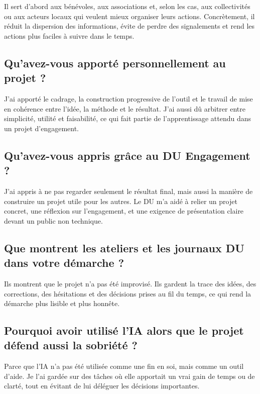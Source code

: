 \documentclass[
  10pt,
  a4paper,
  DIV=11,
  numbers=noendperiod,
  oneside]{scrreprt}
\begin{document}
Il sert d'abord aux bénévoles, aux associations et, selon les cas, aux
collectivités ou aux acteurs locaux qui veulent mieux organiser leurs
actions. Concrètement, il réduit la dispersion des informations, évite
de perdre des signalements et rend les actions plus faciles à suivre
dans le temps.

\subsection{Qu'avez-vous apporté personnellement au projet
?}\label{quavez-vous-apportuxe9-personnellement-au-projet}

J'ai apporté le cadrage, la construction progressive de l'outil et le
travail de mise en cohérence entre l'idée, la méthode et le résultat.
J'ai aussi dû arbitrer entre simplicité, utilité et faisabilité, ce qui
fait partie de l'apprentissage attendu dans un projet d'engagement.

\subsection{Qu'avez-vous appris grâce au DU Engagement
?}\label{quavez-vous-appris-gruxe2ce-au-du-engagement}

J'ai appris à ne pas regarder seulement le résultat final, mais aussi la
manière de construire un projet utile pour les autres. Le DU m'a aidé à
relier un projet concret, une réflexion sur l'engagement, et une
exigence de présentation claire devant un public non technique.

\subsection{Que montrent les ateliers et les journaux DU dans votre
démarche
?}\label{que-montrent-les-ateliers-et-les-journaux-du-dans-votre-duxe9marche}

Ils montrent que le projet n'a pas été improvisé. Ils gardent la trace
des idées, des corrections, des hésitations et des décisions prises au
fil du temps, ce qui rend la démarche plus lisible et plus honnête.

\subsection{Pourquoi avoir utilisé l'IA alors que le projet défend aussi
la sobriété
?}\label{pourquoi-avoir-utilisuxe9-lia-alors-que-le-projet-duxe9fend-aussi-la-sobriuxe9tuxe9}

Parce que l'IA n'a pas été utilisée comme une fin en soi, mais comme un
outil d'aide. Je l'ai gardée sur des tâches où elle apportait un vrai
gain de temps ou de clarté, tout en évitant de lui déléguer les
décisions importantes.
\end{document}
